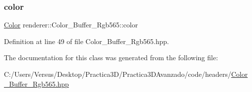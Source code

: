 \mbox{\label{classrenderer_1_1_color___buffer___rgb565_a57d65a5c62338338f7081a32c9227e98}} 
\subsubsection{\texorpdfstring{color}{color}}
{\footnotesize\ttfamily \mbox{\hyperlink{structrenderer_1_1_color___buffer___rgb565_1_1_color}{Color}} renderer\+::\+Color\+\_\+\+Buffer\+\_\+\+Rgb565\+::color\hspace{0.3cm}{\ttfamily [private]}}



Definition at line 49 of file Color\+\_\+\+Buffer\+\_\+\+Rgb565.\+hpp.



The documentation for this class was generated from the following file\+:\begin{DoxyCompactItemize}
\item 
C\+:/\+Users/\+Versus/\+Desktop/\+Practica3\+D/\+Practica3\+D\+Avanzado/code/headers/\mbox{\hyperlink{_color___buffer___rgb565_8hpp}{Color\+\_\+\+Buffer\+\_\+\+Rgb565.\+hpp}}\end{DoxyCompactItemize}
